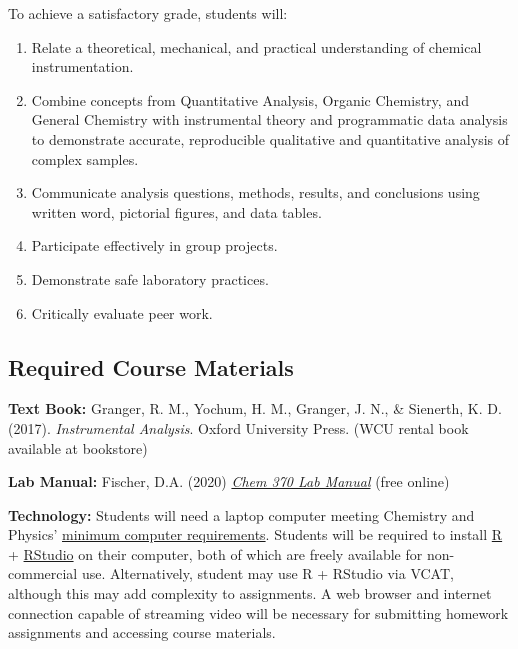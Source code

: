 \documentclass[]{tufte-book}
\begin{document}
To achieve a satisfactory grade, students will:

\begin{enumerate}
\def\labelenumi{\arabic{enumi}.}
\item
  Relate a theoretical, mechanical, and practical understanding of chemical instrumentation.
\item
  Combine concepts from Quantitative Analysis, Organic Chemistry, and General Chemistry with instrumental theory and programmatic data analysis to demonstrate accurate, reproducible qualitative and quantitative analysis of complex samples.
\item
  Communicate analysis questions, methods, results, and conclusions using written word, pictorial figures, and data tables.
\item
  Participate effectively in group projects.
\item
  Demonstrate safe laboratory practices.
\item
  Critically evaluate peer work.
\end{enumerate}

\hypertarget{required-course-materials}{%
\subsection*{Required Course Materials}\label{required-course-materials}}

\textbf{Text Book:} Granger, R. M., Yochum, H. M., Granger, J. N., \& Sienerth, K. D. (2017). \emph{Instrumental Analysis}. Oxford University Press. (WCU rental book available at bookstore)

\textbf{Lab Manual:} Fischer, D.A. (2020) \emph{\href{\%7B\%7Bsite.baseurl\%7D\%7D/chem370/lab-manual}{Chem 370 Lab Manual}} (free online)

\textbf{Technology:} Students will need a laptop computer meeting Chemistry and Physics' \href{https://www.wcu.edu/learn/academic-services/it/computer-guidelines/index.aspx}{minimum computer requirements}. Students will be required to install \href{https://cran.r-project.org/}{R} + \href{https://rstudio.com/}{RStudio} on their computer, both of which are freely available for non-commercial use. Alternatively, student may use R + RStudio via VCAT, although this may add complexity to assignments. A web browser and internet connection capable of streaming video will be necessary for submitting homework assignments and accessing course materials.
\end{document}
